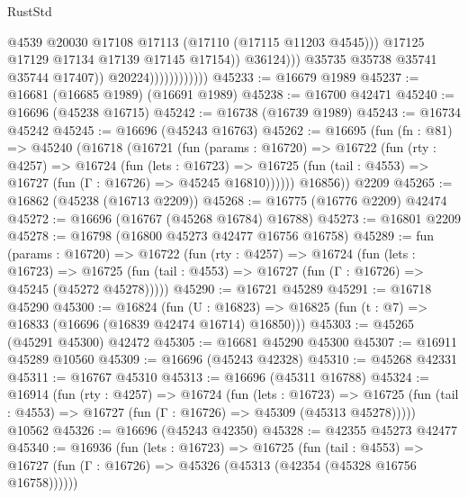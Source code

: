 \begin{lexlean}{RustStd}
\begin{coremodule}
                                            @4539
                                            @20030
                                            @17108
                                            @17113
                                            (@17110 (@17115 @11203 @4545)))
                                          @17125
                                          @17129
                                          @17134
                                          @17139
                                          @17145
                                          @17154))
                                      @36124)))
                                @35735
                                @35738
                                @35741
                                @35744
                                @17407))
                            @20224))))))))))))
@45233 := @16679 @1989
@45237 := @16681 (@16685 @1989) (@16691 @1989)
@45238 := @16700 @42471
@45240 := @16696 (@45238 @16715)
@45242 := @16738 (@16739 @1989)
@45243 := @16734 @45242
@45245 := @16696 (@45243 @16763)
@45262 := @16695
    (fun (fn : @81) =>
    @45240
      (@16718
        (@16721
          (fun (params : @16720) =>
          @16722
            (fun (rty : @4257) =>
            @16724
              (fun (lets : @16723) =>
              @16725 (fun (tail : @4553) => @16727 (fun (Γ : @16726) => @45245 @16810))))))
        @16856))
    @2209
@45265 := @16862 (@45238 (@16713 @2209))
@45268 := @16775 (@16776 @2209) @42474
@45272 := @16696 (@16767 (@45268 @16784) @16788)
@45273 := @16801 @2209
@45278 := @16798 (@16800 @45273 @42477 @16756 @16758)
@45289 := fun (params : @16720) =>
  @16722
    (fun (rty : @4257) =>
    @16724
      (fun (lets : @16723) =>
      @16725 (fun (tail : @4553) => @16727 (fun (Γ : @16726) => @45245 (@45272 @45278)))))
@45290 := @16721 @45289
@45291 := @16718 @45290
@45300 := @16824
    (fun (U : @16823) => @16825 (fun (t : @7) => @16833 (@16696 (@16839 @42474 @16714) @16850)))
@45303 := @45265 (@45291 @45300) @42472
@45305 := @16681 @45290 @45300
@45307 := @16911 @45289 @10560
@45309 := @16696 (@45243 @42328)
@45310 := @45268 @42331
@45311 := @16767 @45310
@45313 := @16696 (@45311 @16788)
@45324 := @16914
    (fun (rty : @4257) =>
    @16724
      (fun (lets : @16723) =>
      @16725 (fun (tail : @4553) => @16727 (fun (Γ : @16726) => @45309 (@45313 @45278)))))
    @10562
@45326 := @16696 (@45243 @42350)
@45328 := @42355 @45273 @42477
@45340 := @16936
    (fun (lets : @16723) =>
    @16725
      (fun (tail : @4553) =>
      @16727 (fun (Γ : @16726) => @45326 (@45313 (@42354 (@45328 @16756 @16758))))))

\end{coremodule}
\end{lexlean}

